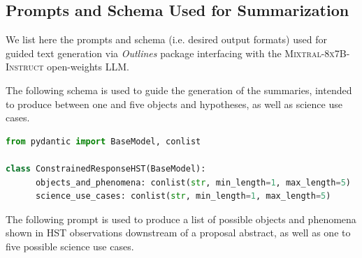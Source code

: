 \documentclass[10pt]{article} %
\newcommand{\package}[1]{\textsl{#1}\xspace}
\begin{document}


\subsection{Prompts and Schema Used for Summarization}
\label{app:summarization}

We list here the prompts and schema (i.e.
%
desired output formats) used for guided text generation via \package{Outlines} package interfacing with the \textsc{Mixtral-8x7B-Instruct} open-weights LLM.

The following schema is used to guide the generation of the summaries, intended to produce between one and five objects and hypotheses, as well as science use cases.

\begin{lstlisting}[language=Python]
from pydantic import BaseModel, conlist

class ConstrainedResponseHST(BaseModel):
      objects_and_phenomena: conlist(str, min_length=1, max_length=5)
      science_use_cases: conlist(str, min_length=1, max_length=5)
\end{lstlisting}

The following prompt is used to produce a list of possible objects and phenomena shown in HST observations downstream of a proposal abstract, as well as one to five possible science use cases.
\end{document}
